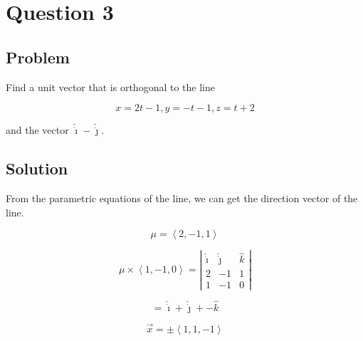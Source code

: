 \documentclass[12pt]{article}
\begin{document}
\section{Question 3}

\subsection{Problem}

Find a unit vector that is orthogonal to the line

\[
    x = 2t - 1, y = -t - 1, z = t + 2
\]

and the vector \(\hat{\dot{\imath}} - \hat{\dot{\jmath}}\).

\subsection{Solution}

From the parametric equations of the line, we can get the direction vector of the line.

\[
    \mu = \left\langle 2, -1, 1\right\rangle
\]

\[
    \mu \times \left\langle 1, -1, 0\right\rangle
    = \left\lvert
    \begin{array}{ccc}
        \hat{\dot{\imath}} & \hat{\dot{\jmath}} & \hat{k} \\
        2                  & -1                 & 1       \\
        1                  & -1                 & 0
    \end{array}
    \right\rvert
\]

\[
    = \hat{\dot{\imath}} + \hat{\dot{\jmath}} + -\hat{k}
\]

\[
    \vec{x} = \pm \left\langle 1, 1, -1\right\rangle
\]
\end{document}
